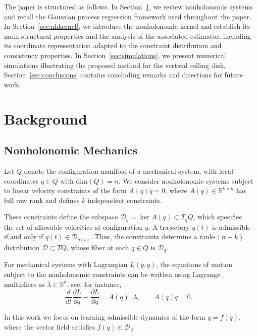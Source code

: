 \documentclass[letterpaper, 10 pt, conference]{ieeeconf}
\newcommand{\R}{\mathbb{R}}
\newcommand{\D}{\mathcal{D}}
\begin{document}
The paper is structured as follows. In Section~\ref{pre}, we review nonholonomic systems and recall the Gaussian process regression framework used throughout the paper. In Section~\ref{sec:nhkernel}, we introduce the nonholonomic kernel and establish its main structural properties and the analysis of the associated estimator, including its coordinate representation adapted to the constraint distribution and consistency properties. In Section~\ref{sec:simulations}, we present numerical simulations illustrating the proposed method for the vertical rolling disk. Section~\ref{sec:conclusions} contains concluding remarks and directions for future work.

\section{Background}\label{pre}

\subsection{Nonholonomic Mechanics}

Let $Q$ denote the configuration manifold of a mechanical system, with local coordinates $q \in Q$ with dim$(Q)=n$. We consider nonholonomic systems subject to linear velocity constraints of the form
$A(q)\dot q = 0$, where $A(q) \in \mathbb{R}^{k \times n}$ has full row rank and defines $k$ independent constraints. 

These constraints define the subspace
$\mathcal{D}_q = \ker A(q) \subset T_q Q$,
which specifies the set of allowable velocities at configuration $q$. A trajectory $q(t)$ is admissible if and only if $\dot q(t) \in \mathcal{D}_{q(t)}$.
Thus, the constraints determine a rank-$(n-k)$ distribution $\mathcal{D}\subset TQ$, whose fiber at each $q\in Q$ is $\D_q$.


For mechanical systems with Lagrangian $L(q,\dot q)$, the equations of motion subject to the nonholonomic constraints can be written using Lagrange multipliers as $\lambda\in\R^k$, see, for instance,  \cite{bloch2003nonholonomic,monforte2002geometric}
\begin{equation*}
\frac{d}{dt}\frac{\partial L}{\partial \dot q} - \frac{\partial L}{\partial q} = A(q)^\top \lambda, \qquad
A(q)\dot q = 0.
\end{equation*}

In this work we focus on learning admissible dynamics of the form $\dot q = f(q)$, where the vector field satisfies $f(q) \in \mathcal{D}_q$.
\end{document}
